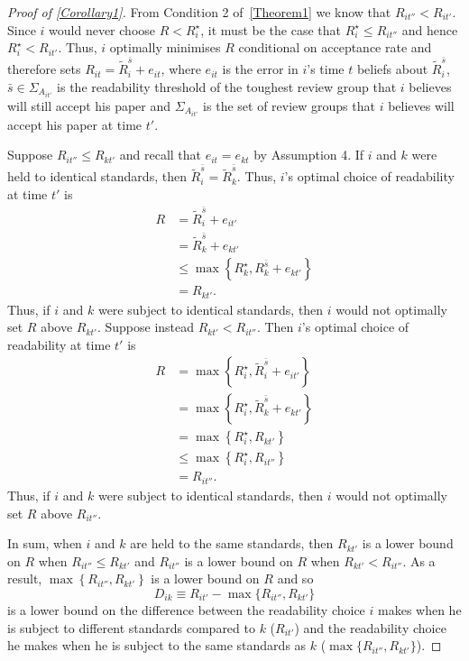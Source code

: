 \begin{proof}[Proof of \autoref{Corollary1}]
	
	From Condition 2 of~\autoref{Theorem1} we know that $R_{it''}<R_{it'}$. Since $i$ would never choose $R<R_i^\star$, it must be the case that $R_i^\star\le R_{it''}$ and hence $R_i^\star<R_{it'}$. Thus, $i$ optimally minimises $R$ conditional on acceptance rate and therefore sets $R_{it}=\widetilde R_i^{\bar s}+e_{it}$, where $e_{it}$ is the error in $i$'s time $t$ beliefs about $\widetilde R_i^{\bar s}$, $\bar s\in\Sigma_{A_{it'}}$ is the readability threshold of the toughest review group that $i$ believes will still accept his paper and $\Sigma_{A_{it'}}$ is the set of review groups that $i$ believes will accept his paper at time $t'$.
	
	Suppose $R_{it''}\le R_{kt'}$ and recall that $e_{it}=e_{kt}$ by Assumption 4. If $i$ and $k$ were held to identical standards, then $\widetilde R_i^{\bar s}=\widetilde R_k^{\bar s}$. Thus, $i$'s optimal choice of readability at time $t'$ is
	\begin{align*}
		R&=\widetilde R_i^{\bar s}+e_{it'}\\
		&=\widetilde R_k^{\bar s} + e_{kt'}\\
		&\le\max\left\{R_k^\star,R_k^{\bar s} + e_{kt'}\right\}\\
		&=R_{kt'}.
	\end{align*}
	Thus, if $i$ and $k$ were subject to identical standards, then $i$ would not optimally set $R$ above $R_{kt'}$. Suppose instead $R_{kt'}<R_{it''}$. Then $i$'s optimal choice of readability at time $t'$ is
	\begin{align*}
		R&=\max\left\{R_i^\star,\widetilde R_i^{\bar s}+e_{it'}\right\} \\
		&=\max\left\{R_i^\star,\widetilde R_k^{\bar s}+e_{kt'}\right\}\\
		&=\max\left\{R_i^\star,R_{kt'}\right\}\\
		&\le\max\left\{R_i^\star, R_{it''}\right\} \\
		&=R_{it''}.
	\end{align*}
	Thus, if $i$ and $k$ were subject to identical standards, then $i$ would not optimally set $R$ above $R_{it''}$.
	
	In sum, when $i$ and $k$ are held to the same standards, then $R_{kt'}$ is a lower bound on $R$ when $R_{it''}\le R_{kt'}$ and $R_{it''}$ is a lower bound on $R$ when $R_{kt'}<R_{it''}$. As a result, $\max\left\{R_{it''},R_{kt'}\right\}$ is a lower bound on $R$ and so $$D_{ik}\equiv R_{it'}-\max\{R_{it''},R_{kt'}\}$$ is a lower bound on the difference between the readability choice $i$ makes when he is subject to different standards compared to $k$ ($R_{it'}$) and the readability choice he makes when he is subject to the same standards as $k$ ($\max\{R_{it''},R_{kt'}\}$).
\end{proof}
